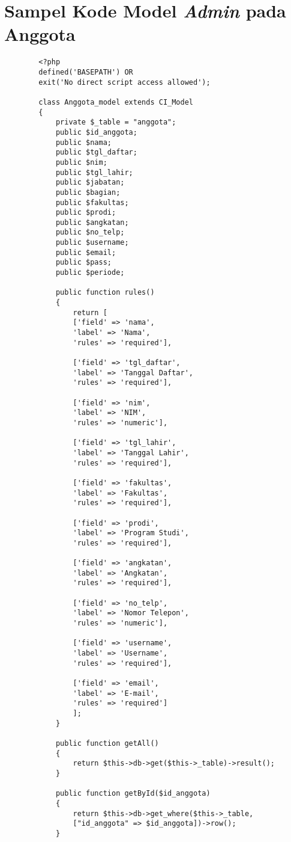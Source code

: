 \chapter{Sampel Kode Model \textit{Admin} pada Anggota}
\begin{verbatim}
		<?php 
		defined('BASEPATH') OR 
		exit('No direct script access allowed');
		
		class Anggota_model extends CI_Model
		{
			private $_table = "anggota";
			public $id_anggota;
			public $nama;
			public $tgl_daftar;
			public $nim;
			public $tgl_lahir;
			public $jabatan;
			public $bagian;
			public $fakultas;
			public $prodi;
			public $angkatan;
			public $no_telp;
			public $username;
			public $email;
			public $pass;
			public $periode;
		
			public function rules()
			{
				return [
				['field' => 'nama',
				'label' => 'Nama',
				'rules' => 'required'],
				
				['field' => 'tgl_daftar',
				'label' => 'Tanggal Daftar',
				'rules' => 'required'],
				
				['field' => 'nim',
				'label' => 'NIM',
				'rules' => 'numeric'],
				
				['field' => 'tgl_lahir',
				'label' => 'Tanggal Lahir',
				'rules' => 'required'],
				
				['field' => 'fakultas',
				'label' => 'Fakultas',
				'rules' => 'required'],
				
				['field' => 'prodi',
				'label' => 'Program Studi',
				'rules' => 'required'],
				
				['field' => 'angkatan',
				'label' => 'Angkatan',
				'rules' => 'required'],
				
				['field' => 'no_telp',
				'label' => 'Nomor Telepon',
				'rules' => 'numeric'],
				
				['field' => 'username',
				'label' => 'Username',
				'rules' => 'required'],
				
				['field' => 'email',
				'label' => 'E-mail',
				'rules' => 'required']
				];
			}
			
			public function getAll()
			{
				return $this->db->get($this->_table)->result();
			}
			
			public function getById($id_anggota)
			{
				return $this->db->get_where($this->_table, 
				["id_anggota" => $id_anggota])->row();
			}
			

\end{verbatim}
